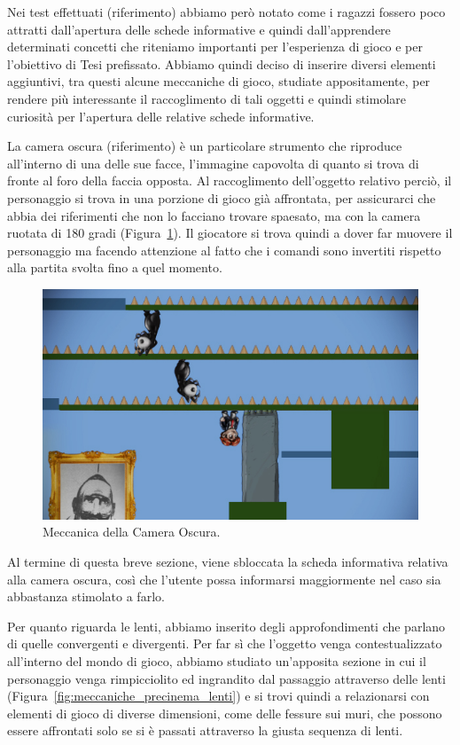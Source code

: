 Nei test effettuati (riferimento) abbiamo però notato come i ragazzi fossero poco attratti dall’apertura delle schede informative e quindi dall’apprendere determinati concetti che riteniamo importanti per l’esperienza di gioco e per l’obiettivo di Tesi prefissato.
Abbiamo quindi deciso di inserire diversi elementi aggiuntivi, tra questi alcune meccaniche di gioco, studiate appositamente, per rendere più interessante il raccoglimento di tali oggetti e quindi stimolare curiosità per l’apertura delle relative schede informative.

La camera oscura (riferimento) è un particolare strumento che riproduce all’interno di una delle sue facce, l’immagine capovolta di quanto si trova di fronte al foro della faccia opposta.
Al raccoglimento dell’oggetto relativo perciò, il personaggio si trova in una porzione di gioco già affrontata, per assicurarci che abbia dei riferimenti che non lo facciano trovare spaesato, ma con la camera ruotata di 180 gradi (Figura~\ref{fig:meccaniche_precinema_camera_oscura}). Il giocatore si trova quindi a dover far muovere il personaggio ma facendo attenzione al fatto che i comandi sono invertiti rispetto alla partita svolta fino a quel momento.

\begin{figure}%
	\centering
	\includegraphics[width= 0.8\columnwidth]{images/gameDesign/23_cameraOscura.jpg}
	\caption{Meccanica della Camera Oscura.}
	\label{fig:meccaniche_precinema_camera_oscura}
\end{figure} 

Al termine di questa breve sezione, viene sbloccata la scheda informativa relativa alla camera oscura, così che l’utente possa informarsi maggiormente nel caso sia abbastanza stimolato a farlo.

Per quanto riguarda le lenti, abbiamo inserito degli approfondimenti che parlano di quelle convergenti e divergenti.
Per far sì che l’oggetto venga contestualizzato all’interno del mondo di gioco, abbiamo studiato un’apposita sezione in cui il personaggio venga rimpicciolito ed ingrandito dal passaggio attraverso delle lenti (Figura~\ref{fig:meccaniche_precinema_lenti}) e si trovi quindi a relazionarsi con elementi di gioco di diverse dimensioni, come delle fessure sui muri, che possono essere affrontati solo se si è passati attraverso la giusta sequenza di lenti.

